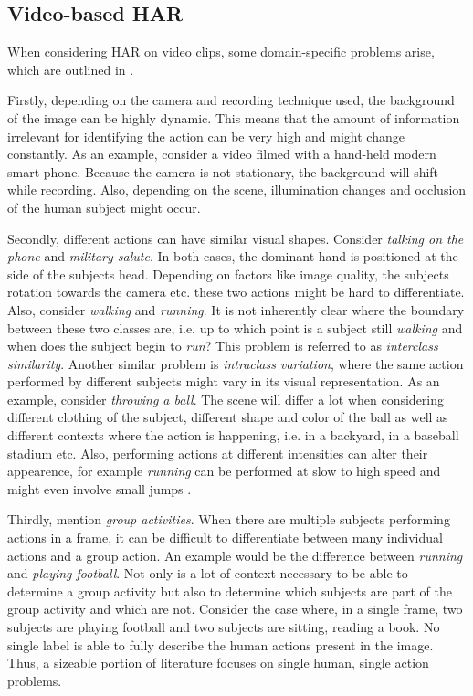 \subsection{Video-based HAR}
When considering HAR on video clips, some domain-specific problems arise, which are outlined in \cite{zhang_review_2017}.

Firstly, depending on the camera and recording technique used, the background of the image can be highly dynamic.
This means that the amount of information irrelevant for identifying the action can be very high and might change constantly.
As an example, consider a video filmed with a hand-held modern smart phone.
Because the camera is not stationary, the background will shift while recording.
Also, depending on the scene, illumination changes and occlusion of the human subject might occur.

Secondly, different actions can have similar visual shapes.
Consider \textit{talking on the phone} and \textit{military salute}.
In both cases, the dominant hand is positioned at the side of the subjects head.
Depending on factors like image quality, the subjects rotation towards the camera etc. these two actions might be hard to differentiate.
Also, consider \textit{walking} and \textit{running}.
It is not inherently clear where the boundary between these two classes are, i.e. up to which point is a subject still \textit{walking} and when does the subject begin to \textit{run}?
This problem is referred to as \textit{interclass similarity}.
Another similar problem is \textit{intraclass variation}, where the same action performed by different subjects might vary in its visual representation.
As an example, consider \textit{throwing a ball}.
The scene will differ a lot when considering different clothing of the subject, different shape and color of the ball as well as different contexts where the action is happening, i.e. in a backyard, in a baseball stadium etc.
Also, performing actions at different intensities can alter their appearence, for example \textit{running} can be performed at slow to high speed and might even involve small jumps \cite{kong_human_2018}.

Thirdly, \cite{zhang_review_2017} mention \textit{group activities}.
When there are multiple subjects performing actions in a frame, it can be difficult to differentiate between many individual actions and a group action.
An example would be the difference between \textit{running} and \textit{playing football}.
Not only is a lot of context necessary to be able to determine a group activity but also to determine which subjects are part of the group activity and which are not.
Consider the case where, in a single frame, two subjects are playing football and two subjects are sitting, reading a book.
No single label is able to fully describe the human actions present in the image.
Thus, a sizeable portion of literature focuses on single human, single action problems.

